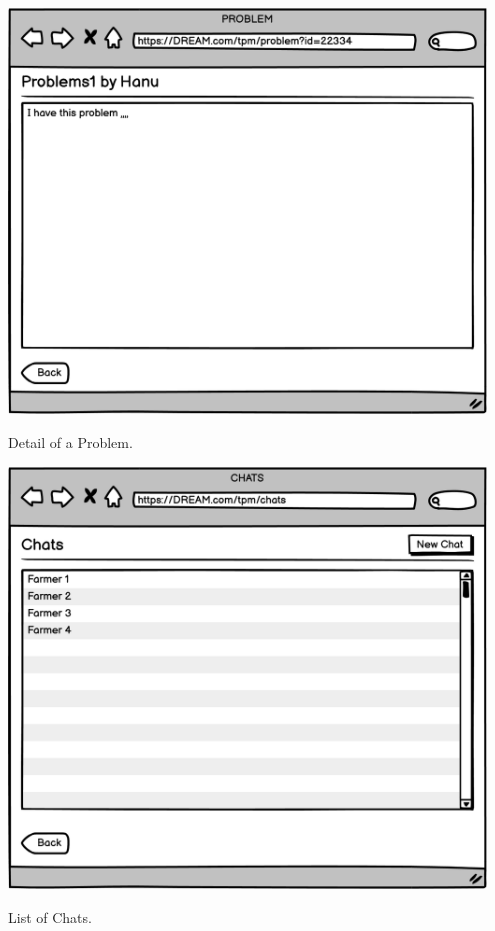 \vspace{0.5cm}
\begin{minipage}{.5\textwidth}
	\centering
	\includegraphics[width=0.95\textwidth]{Images/Mockup/TPM/05TPMProblem1.png}
	\captionsetup{type=figure}
	\caption{Detail of a Problem.}
\end{minipage}%
\begin{minipage}{.5\textwidth}
	\centering
	\includegraphics[width=0.95\textwidth]{Images/Mockup/TPM/06TPMChat.png}
	\captionsetup{type=figure}
	\caption{List of Chats.}
\end{minipage}
